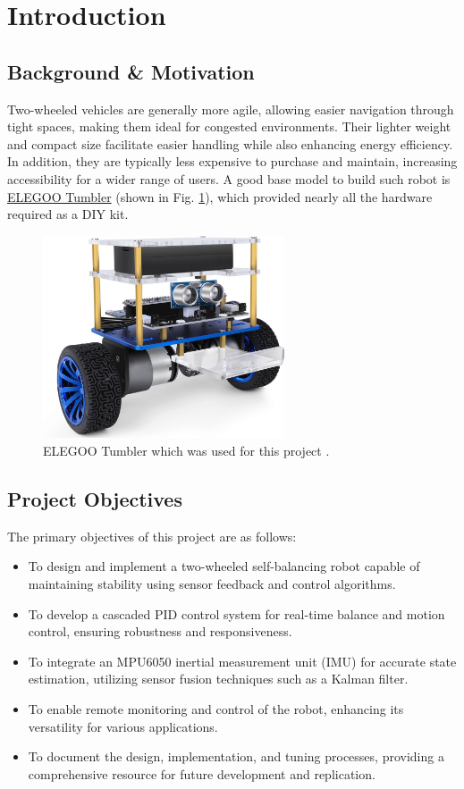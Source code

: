 
\section{Introduction}
\subsection{Background \& Motivation}
Two-wheeled vehicles are generally more agile, allowing easier navigation through tight spaces, making them ideal for congested environments. Their lighter weight and compact size facilitate easier handling while also enhancing energy efficiency. In addition, they are typically less expensive to purchase and maintain, increasing accessibility for a wider range of users.
A good base model to build such robot is \href{https://www.elegoo.com/products/elegoo-tumbller-self-balancing-robot-car}{ELEGOO Tumbler} (shown in Fig. 
\ref{fig:tumbler}), which provided nearly all the hardware required as a DIY kit.

\begin{figure}[h]
	\centering
	\includegraphics[height=6cm]{assets/tumbller.jpg}
	\caption{\label{fig:tumbler} ELEGOO Tumbler which was used for this project \cite{tumbller}.}
\end{figure}

\subsection{Project Objectives}
The primary objectives of this project are as follows:
\begin{itemize}
	\item To design and implement a two-wheeled self-balancing robot capable of maintaining stability using sensor feedback and control algorithms.
	\item To develop a cascaded PID control system for real-time balance and motion control, ensuring robustness and responsiveness.
	\item To integrate an MPU6050 inertial measurement unit (IMU) for accurate state estimation, utilizing sensor fusion techniques such as a Kalman filter.
	\item To enable remote monitoring and control of the robot, enhancing its versatility for various applications.
	\item To document the design, implementation, and tuning processes, providing a comprehensive resource for future development and replication.
\end{itemize}


